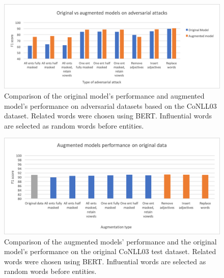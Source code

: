 \begin{table}[h]
\begin{singlespace}
{
    }
    \end{singlespace}
    \caption{Comparison of the original model's performance and augmented model's performance on adversarial datasets based on the CoNLL03 dataset. Related words were chosen using BERT. Influential words are selected as random words before entities.}
    \label{tab:advtraining}
\end{table}
 
 \begin{figure}[h]
	\centering
	\includegraphics[width=0.85\linewidth]{LatexDiss/figures/advtraining.png}
	\caption{Comparison of the original model's performance and augmented model's performance on adversarial datasets based on the CoNLL03 dataset. Related words were chosen using BERT. Influential words are selected as random words before entities.}
	\label{fig:advtraining}
\end{figure}

 \begin{figure}[h]
	\centering
	\includegraphics[width=0.85\linewidth]{LatexDiss/figures/augmodelsorigdata.png}
	\caption{Comparison of the augmented models' performance and the original model's performance on the original CoNLL03 test dataset. Related words were chosen using BERT. Influential words are selected as random words before entities.}
	\label{fig:augmodelsorigdata}
\end{figure}

